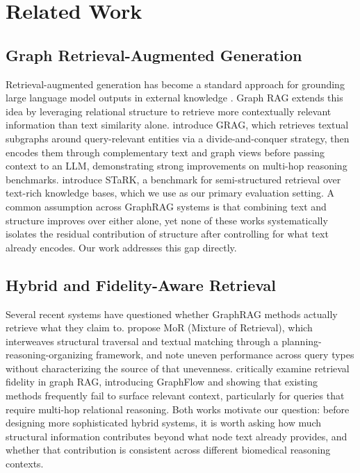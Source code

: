 \documentclass{article}
\theoremstyle{plain}
\theoremstyle{definition}
\theoremstyle{remark}
\begin{document}
\section{Related Work}

\subsection{Graph Retrieval-Augmented Generation}

Retrieval-augmented generation has become a standard approach for grounding large language model outputs in external knowledge \citep{lewis2020rag}. Graph RAG extends this idea by leveraging relational structure to retrieve more contextually relevant information than text similarity alone. \citet{grag2024} introduce GRAG, which retrieves textual subgraphs around query-relevant entities via a divide-and-conquer strategy, then encodes them through complementary text and graph views before passing context to an LLM, demonstrating strong improvements on multi-hop reasoning benchmarks. \citet{stark2024} introduce STaRK, a benchmark for semi-structured retrieval over text-rich knowledge bases, which we use as our primary evaluation setting. A common assumption across GraphRAG systems is that combining text and structure improves over either alone, yet none of these works systematically isolates the residual contribution of structure after controlling for what text already encodes. Our work addresses this gap directly.

\subsection{Hybrid and Fidelity-Aware Retrieval}

Several recent systems have questioned whether GraphRAG methods actually retrieve what they claim to. \citet{mor2025} propose MoR (Mixture of Retrieval), which interweaves structural traversal and textual matching through a planning-reasoning-organizing framework, and note uneven performance across query types without characterizing the source of that unevenness. \citet{graphflow2025} critically examine retrieval fidelity in graph RAG, introducing GraphFlow and showing that existing methods frequently fail to surface relevant context, particularly for queries that require multi-hop relational reasoning. Both works motivate our question: before designing more sophisticated hybrid systems, it is worth asking how much structural information contributes beyond what node text already provides, and whether that contribution is consistent across different biomedical reasoning contexts.
\end{document}
